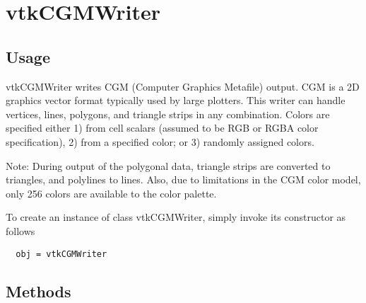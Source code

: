 \section{vtkCGMWriter}

\subsection{Usage}

 vtkCGMWriter writes CGM (Computer Graphics Metafile) output. CGM is a 2D
 graphics vector format typically used by large plotters. This writer can 
 handle vertices, lines, polygons, and triangle strips in any combination. 
 Colors are specified either 1) from cell scalars (assumed to be RGB or 
 RGBA color specification), 2) from a specified color; or 3) randomly 
 assigned colors.

 Note: During output of the polygonal data, triangle strips are converted
 to triangles, and polylines to lines. Also, due to limitations in the CGM 
 color model, only 256 colors are available to the color palette.

To create an instance of class vtkCGMWriter, simply
invoke its constructor as follows
\begin{verbatim}
  obj = vtkCGMWriter
\end{verbatim}
\subsection{Methods}


